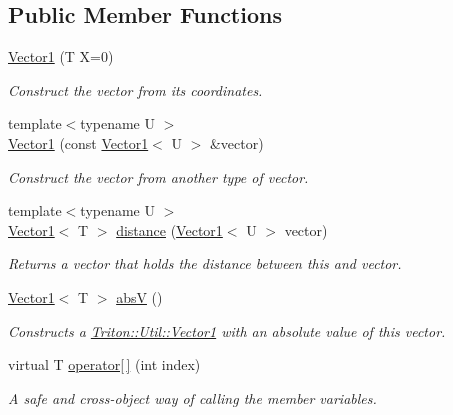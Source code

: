 \subsection*{Public Member Functions}
\begin{DoxyCompactItemize}
\item 
\hyperlink{class_triton_1_1_util_1_1_vector1_a81f8a873ba7e16edb941462a85f8a0bb}{Vector1} (T X=0)
\begin{DoxyCompactList}\small\item\em Construct the vector from its coordinates. \end{DoxyCompactList}\item 
{\footnotesize template$<$typename U $>$ }\\\hyperlink{class_triton_1_1_util_1_1_vector1_a1f1f214d93a14d95418bf415c134def7}{Vector1} (const \hyperlink{class_triton_1_1_util_1_1_vector1}{Vector1}$<$ U $>$ \&vector)
\begin{DoxyCompactList}\small\item\em Construct the vector from another type of vector. \end{DoxyCompactList}\item 
{\footnotesize template$<$typename U $>$ }\\\hyperlink{class_triton_1_1_util_1_1_vector1}{Vector1}$<$ T $>$ \hyperlink{class_triton_1_1_util_1_1_vector1_a01811cae3774b28871bf3c54cd22f040}{distance} (\hyperlink{class_triton_1_1_util_1_1_vector1}{Vector1}$<$ U $>$ vector)
\begin{DoxyCompactList}\small\item\em Returns a vector that holds the distance between this and vector. \end{DoxyCompactList}\item 
\hyperlink{class_triton_1_1_util_1_1_vector1}{Vector1}$<$ T $>$ \hyperlink{class_triton_1_1_util_1_1_vector1_a96679ffc24e262cf49db8f30c887352e}{abs\+V} ()
\begin{DoxyCompactList}\small\item\em Constructs a \hyperlink{class_triton_1_1_util_1_1_vector1}{Triton\+::\+Util\+::\+Vector1} with an absolute value of this vector. \end{DoxyCompactList}\item 
virtual T \hyperlink{class_triton_1_1_util_1_1_vector1_a5b0223acf46ae3ac6afd60bdea748bbf}{operator\mbox{[}$\,$\mbox{]}} (int index)
\begin{DoxyCompactList}\small\item\em A safe and cross-\/object way of calling the member variables. \end{DoxyCompactList}\end{DoxyCompactItemize}

